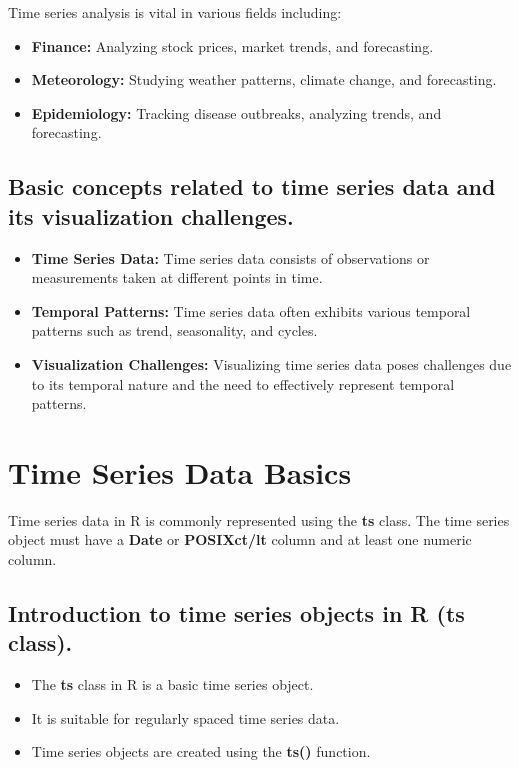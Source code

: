 \documentclass[
]{book}
\begin{document}
Time series analysis is vital in various fields including:

\begin{itemize}
\item
  \textbf{Finance:} Analyzing stock prices, market trends, and forecasting.
\item
  \textbf{Meteorology:} Studying weather patterns, climate change, and forecasting.
\item
  \textbf{Epidemiology:} Tracking disease outbreaks, analyzing trends, and forecasting.
\end{itemize}

\subsection{Basic concepts related to time series data and its visualization challenges.}\label{basic-concepts-related-to-time-series-data-and-its-visualization-challenges.}

\begin{itemize}
\item
  \textbf{Time Series Data:} Time series data consists of observations or measurements taken at different points in time.
\item
  \textbf{Temporal Patterns:} Time series data often exhibits various temporal patterns such as trend, seasonality, and cycles.
\item
  \textbf{Visualization Challenges:} Visualizing time series data poses challenges due to its temporal nature and the need to effectively represent temporal patterns.
\end{itemize}

\section{Time Series Data Basics}\label{time-series-data-basics}

Time series data in R is commonly represented using the \textbf{ts} class. The time series object must have a \textbf{Date} or \textbf{POSIXct/lt} column and at least one numeric column.

\subsection{Introduction to time series objects in R (ts class).}\label{introduction-to-time-series-objects-in-r-ts-class.}

\begin{itemize}
\item
  The \textbf{ts} class in R is a basic time series object.
\item
  It is suitable for regularly spaced time series data.
\item
  Time series objects are created using the \textbf{ts()} function.
\end{itemize}
\end{document}
